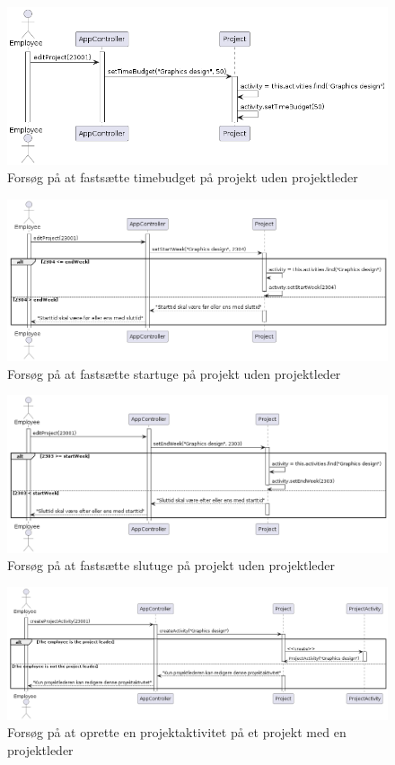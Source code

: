 \begin{figure}[H]
    \centering
    \caption{Forsøg på at fastsætte timebudget på projekt uden projektleder}\label{fig:sequence_create_PA_no_PL_2}
    \includegraphics[width = .75\textwidth]{RequirementsAndDesign/Diagrams/createActivityNoPLCase2.png}
\end{figure}
\begin{figure}[H]
    \centering
    \caption{Forsøg på at fastsætte startuge på projekt uden projektleder}\label{fig:sequence_create_PA_no_PL_3}
    \includegraphics[width = .9\textwidth]{RequirementsAndDesign/Diagrams/createActivityNoPLCase3.png}
\end{figure}
\begin{figure}[H]
    \centering
    \caption{Forsøg på at fastsætte slutuge på projekt uden projektleder}\label{fig:sequence_create_PA_no_PL_4}
    \includegraphics[width = .9\textwidth]{RequirementsAndDesign/Diagrams/createActivityNoPLCase4.png}
\end{figure}
\begin{figure}[H]
    \centering
    \caption{Forsøg på at oprette en projektaktivitet på et projekt med en projektleder}\label{fig:sequence_create_PA_PL}
    \includegraphics[width = .95\textwidth]{RequirementsAndDesign/Diagrams/createActivityPL.png}
\end{figure}
